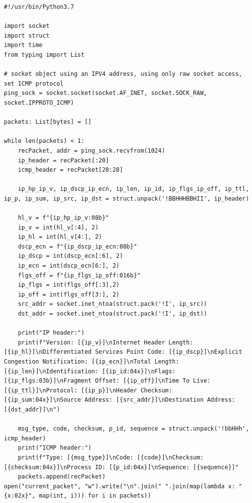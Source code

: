 \documentclass[titlepage]{article}
\begin{document}
\begin{lstlisting}[label=echorecv,caption=\textit{A prototype for receiving \gls{icmp} ECHO REQUEST packets.}]
#!/usr/bin/Python3.7

import socket
import struct
import time
from typing import List

# socket object using an IPV4 address, using only raw socket access, set ICMP protocol        
ping_sock = socket.socket(socket.AF_INET, socket.SOCK_RAW, socket.IPPROTO_ICMP)

packets: List[bytes] = []

while len(packets) < 1:
    recPacket, addr = ping_sock.recvfrom(1024)
    ip_header = recPacket[:20]
    icmp_header = recPacket[20:28]

    ip_hp_ip_v, ip_dscp_ip_ecn, ip_len, ip_id, ip_flgs_ip_off, ip_ttl, ip_p, ip_sum, ip_src, ip_dst = struct.unpack('!BBHHHBBHII', ip_header)

    hl_v = f"{ip_hp_ip_v:08b}"
    ip_v = int(hl_v[:4], 2)
    ip_hl = int(hl_v[4:], 2)
    dscp_ecn = f"{ip_dscp_ip_ecn:08b}"
    ip_dscp = int(dscp_ecn[:6], 2)
    ip_ecn = int(dscp_ecn[6:], 2)
    flgs_off = f"{ip_flgs_ip_off:016b}"
    ip_flgs = int(flgs_off[:3],2)
    ip_off = int(flgs_off[3:], 2)
    src_addr = socket.inet_ntoa(struct.pack('!I', ip_src))
    dst_addr = socket.inet_ntoa(struct.pack('!I', ip_dst))

    print("IP header:")
    print(f"Version: [{ip_v}]\nInternet Header Length: [{ip_hl}]\nDifferentiated Services Point Code: [{ip_dscp}]\nExplicit Congestion Notification: [{ip_ecn}]\nTotal Length: [{ip_len}]\nIdentification: [{ip_id:04x}]\nFlags: [{ip_flgs:03b}]\nFragment Offset: [{ip_off}]\nTime To Live: [{ip_ttl}]\nProtocol: [{ip_p}]\nHeader Checksum: [{ip_sum:04x}]\nSource Address: [{src_addr}]\nDestination Address: [{dst_addr}]\n")

    msg_type, code, checksum, p_id, sequence = struct.unpack('!bbHHh', icmp_header)
    print("ICMP header:")
    print(f"Type: [{msg_type}]\nCode: [{code}]\nChecksum: [{checksum:04x}]\nProcess ID: [{p_id:04x}]\nSequence: [{sequence}]"
    packets.append(recPacket)
open("current_packet", "w").write("\n".join(" ".join(map(lambda x: "{x:02x}", map(int, i))) for i in packets))
\end{lstlisting}
\end{document}
